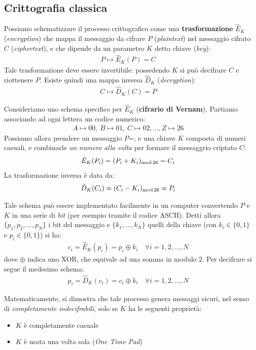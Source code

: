 \documentclass[../../InformazioneQuantistica.tex]{subfiles}
\begin{document}
\subsection{Crittografia classica}
Possiamo schematizzare il processo crittografico come una \textbf{trasformazione} $\hat{E}_K$ (\textit{encryption}) che mappa il messaggio da cifrare $P$ (\textit{plaintext}) nel messaggio cifrato $C$ (\textit{ciphertext}), e che dipende da un parametro $K$ detto chiave (\textit{key}):
\begin{align*}
P \mapsto \hat{E}_K(P) = C
\end{align*}
 Tale trasformazione deve essere invertibile: possedendo $K$ si può decifrare $C$ e riottenere $P$. Esiste quindi una mappa inversa $\hat{D}_K$ (\textit{decryption}):
\begin{align*}
C \mapsto \hat{D}_K(C) = P
\end{align*}

Consideriamo uno schema specifico per $\hat{E}_K$ (\textbf{cifrario di Vernam}). Partiamo associando ad ogni lettera un codice numerico:
\begin{align*}
A\mapsto 00, \> B \mapsto 01, \> C \mapsto 02, \dots , Z \mapsto 26
\end{align*}
Possiamo allora prendere un messaggio $P$=, e una chiave $K$ composta di numeri casuali, e combinarle \textit{un numero alla volta} per formare il messaggrio criptato $C$:
\begin{align*}
\hat{E}_K(P_i) = (P_i + K_i)_{\operatorname{mod}26} = C_i
\end{align*}
La trasformazione inversa è data da:
\begin{align*}
\hat{D}_K(C_i) = (C_i - K_i)_{\operatorname{mod}26} = P_i
\end{align*}

\begin{expl}
Tale schema può essere implementato facilmente in un computer convertendo $P$ e $K$ in una serie di \textit{bit} (per esempio tramite il codice ASCII). Detti allora $\{p_1, p_2, \dots, p_N\}$ i bit del messaggio e $\{k_1, \dots, k_N\}$ quelli della chiave (con $k_i \in \{0,1\}$ e $p_i \in \{0,1\}$) si ha:
\begin{align*}
c_i = \hat{E}_{K}(p_i) = p_i \oplus k_i \quad \forall i = 1, 2, \dots, N
\end{align*}
dove $\oplus$ indica uno XOR, che equivale ad una somma in modulo $2$. Per decifrare si segue il medesimo schema:
\begin{align*}
p_i = \hat{D}_K(c_i) = c_i \oplus k_i \quad \forall i =1, 2, \dots, N
\end{align*}
\end{expl}
Matematicamente, si dimostra che tale processo genera messaggi sicuri, nel senso di \textit{completamente indecifrabili}, solo se $K$ ha le seguenti proprietà:
\begin{itemize}
\item $K$ è completamente casuale
\item $K$ è usata una volta sola (\textit{One Time Pad})
\end{itemize}
\end{document}
